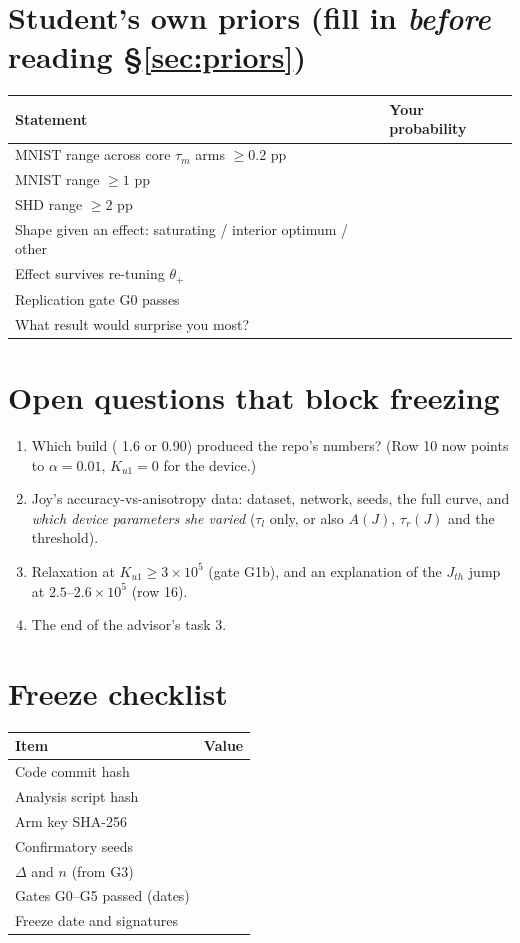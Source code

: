 \documentclass[10pt,a4paper]{article}
\newcommand{\code}[1]{\path{#1}}
\newcommand{\taum}{\tau_m}
\newcommand{\ptn}{\Delta}
\begin{document}
\section{Student's own priors (fill in \emph{before} reading \S\ref{sec:priors})}
\begin{center}\small
\begin{tabularx}{\textwidth}{@{}Xp{3cm}@{}}
\toprule Statement & Your probability\\ \midrule
MNIST range across core $\taum$ arms $\ge0.2$ pp & \\
MNIST range $\ge1$ pp & \\
SHD range $\ge2$ pp & \\
Shape given an effect: saturating / interior optimum / other & \\
Effect survives re-tuning $\theta_+$ & \\
Replication gate G0 passes & \\
What result would surprise you most? & \\
\bottomrule\end{tabularx}
\end{center}

\section{Open questions that block freezing}
\begin{enumerate}
\item Which build (\code{NEG_THRESHOLD} 1.6 or 0.90) produced the repo's numbers? (Row 10 now points to $\alpha=0.01$, $K_{u1}=0$ for the device.)
\item Joy's accuracy-vs-anisotropy data: dataset, network, seeds, the full curve, and \emph{which device parameters she varied} ($\tau_l$ only, or also $A(J)$, $\tau_r(J)$ and the threshold).
\item Relaxation at $K_{u1}\ge3\times10^5$ (gate G1b), and an explanation of the $J_{th}$ jump at $2.5$--$2.6\times10^5$ (row 16).
\item The end of the advisor's task 3.
\end{enumerate}

\section{Freeze checklist}
\begin{center}\small
\begin{tabularx}{\textwidth}{@{}L{5cm}X@{}}
\toprule Item & Value\\ \midrule
Code commit hash & \\
Analysis script hash & \\
Arm key SHA-256 & \\
Confirmatory seeds & \\
$\ptn$ and $n$ (from G3) & \\
Gates G0--G5 passed (dates) & \\
Freeze date and signatures & \\
\bottomrule\end{tabularx}
\end{center}
\end{document}
